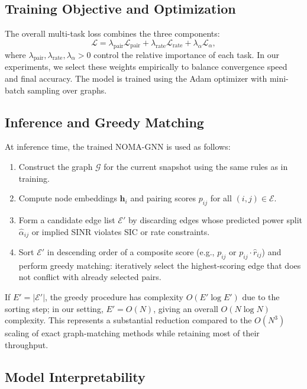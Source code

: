 \subsection{Training Objective and Optimization}

The overall multi-task loss combines the three components:
\begin{equation}
\mathcal{L} =
\lambda_{\text{pair}} \mathcal{L}_{\text{pair}} +
\lambda_{\text{rate}} \mathcal{L}_{\text{rate}} +
\lambda_{\alpha} \mathcal{L}_{\alpha},
\end{equation}
where $\lambda_{\text{pair}}, \lambda_{\text{rate}}, \lambda_{\alpha} > 0$ control the relative importance of each task. In our experiments, we select these weights empirically to balance convergence speed and final accuracy. The model is trained using the Adam optimizer with mini-batch sampling over graphs.

\subsection{Inference and Greedy Matching}

At inference time, the trained NOMA-GNN is used as follows:

\begin{enumerate}
    \item Construct the graph $\mathcal{G}$ for the current snapshot using the same rules as in training.
    \item Compute node embeddings $\mathbf{h}_i$ and pairing scores $p_{ij}$ for all $(i,j)\in\mathcal{E}$.
    \item Form a candidate edge list $\mathcal{E}'$ by discarding edges whose predicted power split $\hat{\alpha}_{ij}$ or implied SINR violates SIC or rate constraints.
    \item Sort $\mathcal{E}'$ in descending order of a composite score (e.g., $p_{ij}$ or $p_{ij} \cdot \hat{r}_{ij}$) and perform greedy matching: iteratively select the highest-scoring edge that does not conflict with already selected pairs.
\end{enumerate}

If $E' = |\mathcal{E}'|$, the greedy procedure has complexity $O(E' \log E')$ due to the sorting step; in our setting, $E' = O(N)$, giving an overall $O(N \log N)$ complexity. This represents a substantial reduction compared to the $O(N^3)$ scaling of exact graph-matching methods while retaining most of their throughput.

\subsection{Model Interpretability}

